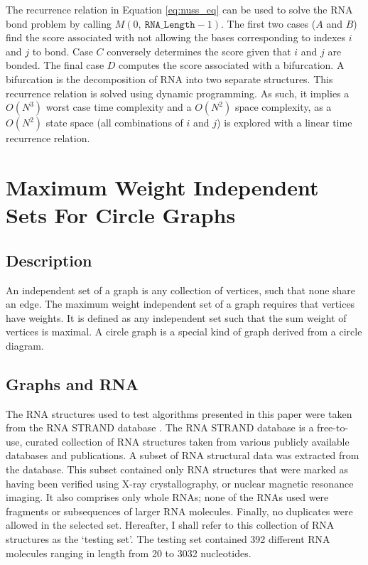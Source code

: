 \documentclass[12pt, a4paper]{article}
\begin{document}
The recurrence relation in Equation \ref{eq:nuss_eq} can be used to solve the RNA bond problem by calling $M(0, \: \texttt{RNA\_Length}-1)$. The first two cases ($A$ and $B$) find the score associated with not allowing the bases corresponding to indexes $i$ and $j$ to bond. Case $C$ conversely determines the score given that $i$ and $j$ are bonded. The final case $D$ computes the score associated with a bifurcation. A bifurcation is the decomposition of RNA into two separate structures. This recurrence relation is solved using dynamic programming. As such, it implies a $O(N^3)$
worst case time complexity and a $O(N^2)$ space complexity, as a $O(N^2)$ state space (all combinations of $i$ and $j$) is explored
with a linear time recurrence relation.


\section{Maximum Weight Independent Sets For Circle Graphs}
\subsection{Description}
An independent set of a graph is any collection of vertices, such that none share an edge. The maximum weight independent set of a graph requires that vertices have weights. It is defined as any independent set such that the sum weight of vertices is maximal. A circle graph is a special kind of graph derived from a circle diagram.

\subsection{Graphs and RNA}
The RNA structures used to test algorithms presented in this paper were taken from the RNA STRAND database \cite{andronescu2008rna}. The RNA STRAND database is a free-to-use, curated collection of RNA structures taken from various publicly available databases and publications. A subset of RNA structural data was extracted from the database. This subset contained only RNA structures that were marked as having been verified using X-ray crystallography, or nuclear magnetic resonance imaging. It also comprises only whole RNAs; none of the RNAs used were fragments or subsequences of larger RNA molecules. Finally, no duplicates were allowed in the selected set. Hereafter, I shall refer to this collection of RNA structures as the `testing set'. The testing set contained 392 different RNA molecules ranging in length from 20 to 3032 nucleotides.
\end{document}
